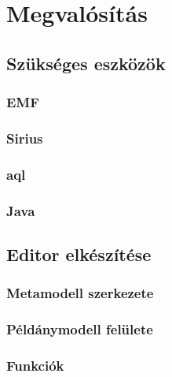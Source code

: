 \chapter{Megvalósítás}
\section{Szükséges eszközök}
\subsection{EMF}
\subsection{Sirius}
\subsection{aql}
\subsection{Java}
\section{Editor elkészítése}
\subsection{Metamodell szerkezete}
\subsection{Példánymodell felülete}
\subsection{Funkciók}